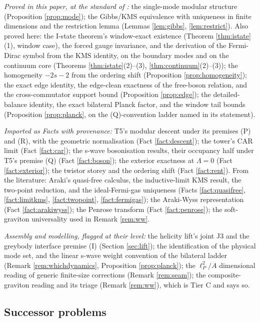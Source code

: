 \emph{Proved in this paper, at the standard of \cite{ButlerT1}:} the single-mode modular structure (Proposition \ref{prop:mode}); the Gibbs/KMS equivalence with uniqueness in finite dimensions and the restriction lemma (Lemmas \ref{lem:gibbs}, \ref{lem:restrict}). Also proved here: the I-state theorem's window-exact existence (Theorem \ref{thm:istate}(1), window case), the forced gauge invariance, and the derivation of the Fermi-Dirac symbol from the KMS identity, on the boundary modes and on the continuum core (Theorems \ref{thm:istate}(2)--(3), \ref{thm:continuum}(2)--(3)); the homogeneity $-2s-2$ from the ordering shift (Proposition \ref{prop:homogeneity}); the exact edge identity, the edge-clean exactness of the free-boson relation, and the cross-commutator support bound (Proposition \ref{prop:edge}); the detailed-balance identity, the exact bilateral Planck factor, and the window tail bounds (Proposition \ref{prop:planck}, on the (Q)-convention ladder named in its statement).

\emph{Imported as Facts with provenance:} T5's modular descent under its premises (P) and (R), with the geometric normalisation (Fact \ref{fact:descent}); the tower's CAR limit (Fact \ref{fact:car}); the s-wave bosonisation results, their occupancy half under T5's premise (Q) (Fact \ref{fact:boson}); the exterior exactness at $\Lambda = 0$ (Fact \ref{fact:exterior}); the twistor storey and the ordering shift (Fact \ref{fact:rent}). From the literature: Araki's quasi-free calculus, the inductive-limit KMS result, the two-point reduction, and the ideal-Fermi-gas uniqueness (Facts \ref{fact:quasifree}, \ref{fact:limitkms}, \ref{fact:twopoint}, \ref{fact:fermigas}); the Araki-Wyss representation (Fact \ref{fact:arakiwyss}); the Penrose transform (Fact \ref{fact:penrose}); the soft-graviton universality \cite{Weinberg1964} used in Remark \ref{rem:ww}.

\emph{Assembly and modelling, flagged at their level:} the helicity lift's joint J3 and the greybody interface premise (I) (Section \ref{sec:lift}); the identification of the physical mode set, and the linear s-wave weight convention of the bilateral ladder (Remark \ref{rem:whichdynamics}, Proposition \ref{prop:planck}); the $\ell_P^2/A$ dimensional reading of generic finite-size corrections (Remark \ref{rem:seam}); the composite-graviton reading and its triage (Remark \ref{rem:ww}), which is Tier C and says so.

\subsection*{Successor problems}

